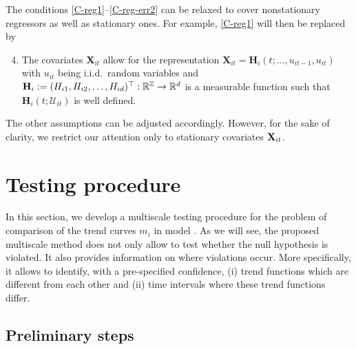 \documentclass[a4paper,12pt]{article}
\makeatletter
\renewcommand{\eqref}[1]{\tagform@{\ref{#1}}}
\makeatother
\begin{document}
\begin{remark}
The conditions \ref{C-reg1}--\ref{C-reg-err2} can be relaxed to cover nonstationary regressors as well as stationary ones. For example, \ref{C-reg1} will then be replaced by
\begin{enumerate}[label=(C\arabic*$^\ast$),leftmargin=1.05cm]
\setcounter{enumi}{3}
\item \label{C-reg1-star} The covariates $ \mathbf{X}_{it}$ allow for the representation $ \mathbf{X}_{it} = \mathbf{H}_i(t; \ldots,u_{it-1},u_{it})$ with $u_{it}$ being i.i.d.\ random variables and $\mathbf{H}_i := (H_{i1}, H_{i2}, \ldots, H_{id})^\top: \mathbb{R}^{\mathbb{Z}} \rightarrow \mathbb{R}^d$ is a measurable function such that $\mathbf{H}_i(t;\mathcal{U}_{it})$ is well defined. 
\end{enumerate} 
The other assumptions can be adjusted accordingly. However, for the sake of clarity, we restrict our attention only to stationary  covariates $\mathbf{X}_{it}$. 
\end{remark}


\section{Testing procedure}\label{sec:test}

In this section, we develop a multiscale testing procedure for the problem of comparison of the trend curves $m_i$ in model \eqref{eq:model_full}.  As we will see, the proposed multiscale method does not only allow to test whether the null hypothesis is violated. It also provides information on where violations occur. More specifically, it allows to identify, with a pre-specified confidence, (i) trend functions which are different from each other and (ii) time intervals where these trend functions differ.



\subsection{Preliminary steps}\label{subsec:test:prep}
\end{document}
